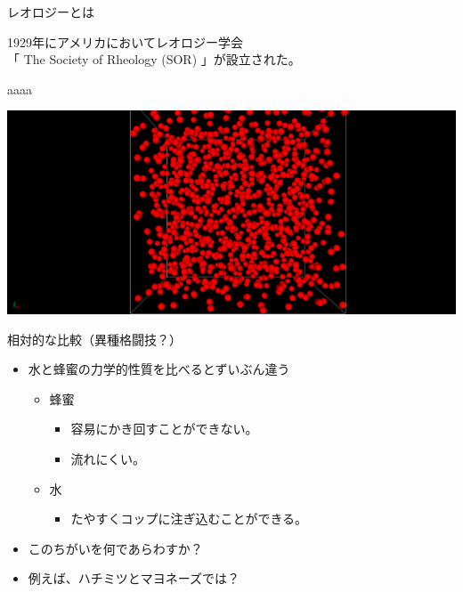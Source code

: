 \begin{frame}

\begin{block}{レオロジーとは}

1929年にアメリカにおいてレオロジー学会\\
「 The Society of Rheology (SOR) 」が設立された。

aaaa

\href{fig/fig_4_3/N1_Melt.mp4}{\includegraphics{fig/fig_4_3/N1_Melt.png}}

\end{block}

\end{frame}

\begin{frame}

\begin{block}{相対的な比較（異種格闘技？）}

\begin{itemize}

\item
  水と蜂蜜の力学的性質を比べるとずいぶん違う

  \begin{itemize}
  
  \item
    蜂蜜

    \begin{itemize}
    
    \item
      容易にかき回すことができない。
    \item
      流れにくい。
    \end{itemize}
  \item
    水

    \begin{itemize}
    
    \item
      たやすくコップに注ぎ込むことができる。
    \end{itemize}
  \end{itemize}
\item
  このちがいを何であらわすか？
\item
  例えば、ハチミツとマヨネーズでは？
\end{itemize}

\end{block}

\end{frame}

